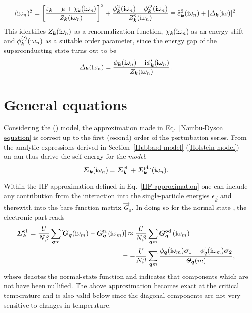 %
\begin{align*}
    (\mathrm i \omega_n)^2 = \left[ \frac
        {\varepsilon_{\boldsymbol k} - \mu + \chi_{\boldsymbol k}(\mathrm i \omega_n)}
        {Z_{\boldsymbol k}(\mathrm i \omega_n)}
    \right]^2
    + \frac
        {\phi_{\boldsymbol k}^2(\mathrm i \omega_n) + \phi'^2_{\boldsymbol k}(\mathrm i \omega_n)}
        {Z_{\boldsymbol k}^2(\mathrm i \omega_n)}
    \equiv \widetilde {\varepsilon}^2_{\boldsymbol k}(\mathrm i \omega_n)
    + |\varDelta_{\boldsymbol k}(\mathrm i \omega)|^2.
\end{align*}
%
This identifies $Z_{\boldsymbol k}(\mathrm i \omega_n)$ as a renormalization function,
$\chi_{\boldsymbol k}(\mathrm i \omega_n)$ as an energy shift and $\phi^{(\prime)}_{\boldsymbol k}(\mathrm i
\omega_n)$ as a suitable order parameter, since the energy gap of the
superconducting state turns out to be
%
\begin{align*}
    \varDelta_{\boldsymbol k}(\mathrm i \omega_n) = \frac
        {\phi_{\boldsymbol k}(\mathrm i \omega_n) - \mathrm i \phi'_{\boldsymbol k}(\mathrm i \omega_n)}
        {Z_{\boldsymbol k}(\mathrm i \omega_n)}.
\end{align*}

\section{General equations}

Considering the  () model, the approximation made
in Eq.~\ref{Nambu-Dyson equation} is correct up to the first (second) order of
the perturbation series. From the analytic expressions derived in
Section~\ref{Hubbard model} (\ref{Holstein model}) on can thus derive the
self-energy for the \emph{ model},
%
\begin{equation*}
    \boldsymbol {\varSigma}_{\boldsymbol k} (\mathrm i \omega_n)
    = \boldsymbol {\varSigma}_{\boldsymbol k} \sp{\text{el.}}
    + \boldsymbol {\varSigma}_{\boldsymbol k} \sp{\text{ph.}} (\mathrm i \omega_n).
\end{equation*}

Within the HF approximation defined in Eq.~\ref{HF approximation} one can
include any contribution from the  interaction into the
single-particle energies $\epsilon_{\vec k}$ and therewith into the bare
 function matrix $\vec G_0$. In doing so for the normal state
\cite[37]{AllenMitrovic82}, the electronic part reads
%
\begin{align*}
    \boldsymbol {\varSigma}_{\boldsymbol k} \sp{\text{el.}}
    = \frac{U}{N \beta} \sum_{\boldsymbol q m}
        [ \boldsymbol G_{\boldsymbol q} (\mathrm i \omega_m)
        - \boldsymbol G_{\boldsymbol q} \sp{\text{n.}} (\mathrm i \omega_m) ]
    \approx \frac{U}{N \beta} &\sum_{\boldsymbol q m}
        \boldsymbol G_{\boldsymbol q} \sp{\text{od.}} (\mathrm i \omega_m)
    \\
    = -\frac{U}{N \beta} &\sum_{\boldsymbol q m} \frac
        { \phi _{\boldsymbol q}(\mathrm i \omega_m) \boldsymbol \sigma_1
        + \phi'_{\boldsymbol q}(\mathrm i \omega_m) \boldsymbol \sigma_2 }
        {\varTheta_{\boldsymbol q}(m)},
\end{align*}
%
where  denotes the normal-state  function and 
indicates that components which are not  have been nullified.
The above approximation becomes exact at the critical temperature and is also
valid below \cite[38]{AllenMitrovic82} since the diagonal components are not
very sensitive to changes in temperature.

